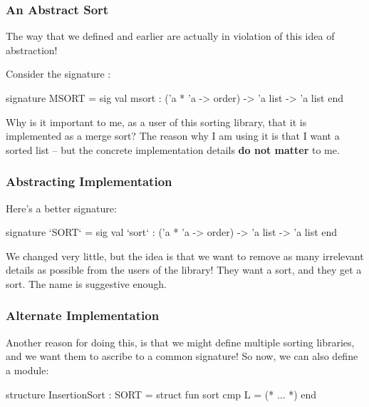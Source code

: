 \documentclass[aspectratio=169, handout]{beamer}
\begin{document}
\begin{frame}[fragile]
  \frametitle{An Abstract Sort}

  The way that we defined  and  earlier are actually
  in violation of this idea of abstraction!

  \pause
  \vspace{\fill}

  Consider the signature :

  \begin{codeblock}
    signature MSORT =
      sig
        val msort : ('a * 'a -> order) -> 'a list -> 'a list
      end
  \end{codeblock}

  \pause
  \vspace{\fill}

  Why is it important to me, as a user of this sorting library, that it
  is implemented as a merge sort? The reason why I am using it is that I
  want a sorted list -- but the concrete implementation details
  \textbf{do not matter} to me.\footnotemark

\end{frame}

\begin{frame}[fragile]
  \frametitle{Abstracting Implementation}

  Here's a better signature:

  \begin{codeblock}
    signature `SORT` =
      sig
        val `sort` : ('a * 'a -> order) -> 'a list -> 'a list
      end
  \end{codeblock}

  \pause
  \vspace{\fill}

  We changed very little, but the idea is that we want to remove as many irrelevant
  details as possible from the users of the library! They want a sort, and they
  get a sort. The name is suggestive enough.
\end{frame}

\begin{frame}[fragile]
  \frametitle{Alternate Implementation}

  Another reason for doing this, is that we might define multiple sorting libraries,
  and we want them to ascribe to a common signature! So now, we can also define a
   module:

  \pause
  \vspace{\fill}

  \begin{codeblock}
    structure InsertionSort : SORT =
      struct
        fun sort cmp L = (* ... *)
      end
  \end{codeblock}
\end{frame}
\end{document}
